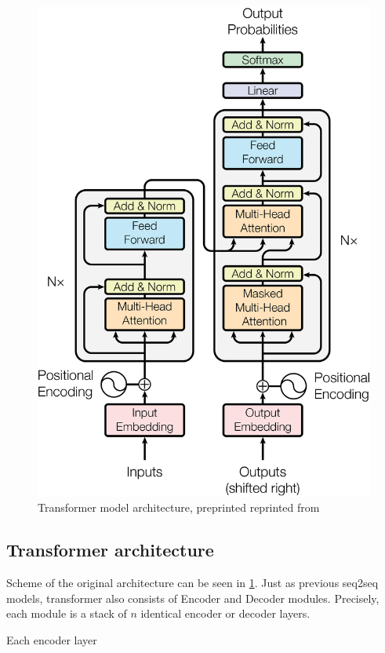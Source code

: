\begin{figure}
  \includegraphics[scale=0.5]{my_modules/multimedia/atalyned.png}
  \caption{Transformer model architecture, preprinted reprinted from \cite{vaswani2017attention}}
  \label{fig:transformer}
\end{figure}

\subsection{Transformer architecture}
Scheme of the original architecture can be seen in \ref{fig:transformer}. Just as previous seq2seq models, transformer also consists of Encoder and Decoder modules. Precisely, each module is a stack of $n$ identical encoder or decoder layers.

Each encoder layer 

